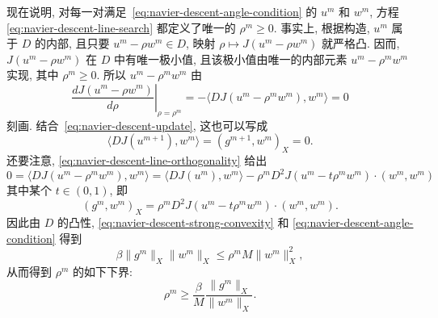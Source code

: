 \begin{Proof}
现在说明, 对每一对满足 \,\eqref{eq:navier-descent-angle-condition} 的 $u^m$ 和
$w^m$, 方程 \,\eqref{eq:navier-descent-line-search} 都定义了唯一的 $\rho^m\geq0$.
事实上, 根据构造, $u^m$ 属于 $D$ 的内部, 且只要 $u^m-\rho w^m\in D$, 映射
$\rho\mapsto J(u^m-\rho w^m)$ 就严格凸. 因而, $J(u^m-\rho w^m)$ 在 $D$
中有唯一极小值, 且该极小值由唯一的内部元素 $u^m-\rho^mw^m$ 实现, 其中
$\rho^m\geq0$. 所以 $u^m-\rho^mw^m$ 由
\[
\left.\frac{dJ(u^m-\rho w^m)}{d\rho}\right|_{\rho=\rho^m}
=-\langle DJ(u^m-\rho^mw^m),w^m\rangle=0
\]
刻画. 结合 \,\eqref{eq:navier-descent-update}, 这也可以写成
\begin{equation}
\label{eq:navier-descent-line-orthogonality}
\langle DJ(u^{m+1}),w^m\rangle=(g^{m+1},w^m)_X=0.
\end{equation}
还要注意, \eqref{eq:navier-descent-line-orthogonality} 给出
\[
0=\langle DJ(u^m-\rho^mw^m),w^m\rangle
=\langle DJ(u^m),w^m\rangle
-\rho^mD^2J(u^m-t\rho^mw^m)\mathbin{\cdot}(w^m,w^m)
\]
其中某个 $t\in(0,1)$, 即
\begin{equation}
\label{eq:navier-descent-line-second-derivative}
(g^m,w^m)_X
=\rho^mD^2J(u^m-t\rho^mw^m)\mathbin{\cdot}(w^m,w^m).
\end{equation}
因此由 $D$ 的凸性, \eqref{eq:navier-descent-strong-convexity} 和
\eqref{eq:navier-descent-angle-condition} 得到
\[
\beta\|g^m\|_X\|w^m\|_X\leq\rho^mM\|w^m\|_X^2,
\]
从而得到 $\rho^m$ 的如下下界:
\begin{equation}
\label{eq:navier-descent-step-lower}
\rho^m\geq\frac\beta M\frac{\|g^m\|_X}{\|w^m\|_X}.
\end{equation}


\end{Proof}
